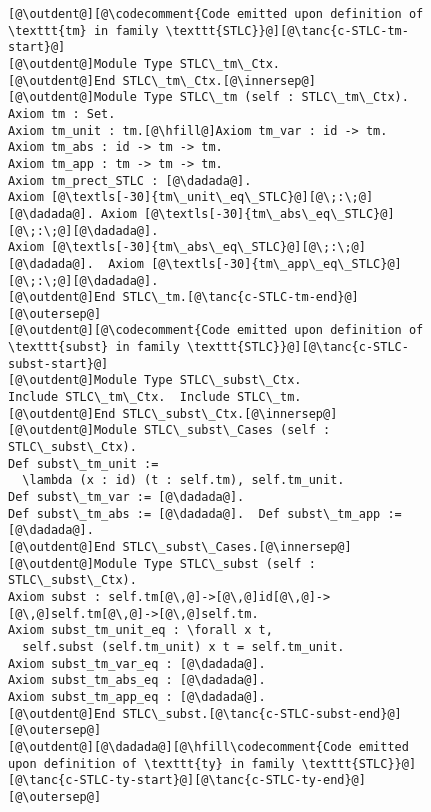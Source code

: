 \begin{figure}
\vspace{-5pt}
\begin{minipage}{\textwidth}
\begin{multicols}{2}



\newcommand{\innersep}{\vspace{6pt}}
\newcommand{\outersep}{\vspace{5pt}}
\newcommand{\outdent}{\!\!\!}

\begin{lstlisting}
[@\outdent@][@\codecomment{Code emitted upon definition of \texttt{tm} in family \texttt{STLC}}@][@\tanc{c-STLC-tm-start}@]
[@\outdent@]Module Type STLC\_tm\_Ctx.
[@\outdent@]End STLC\_tm\_Ctx.[@\innersep@]
[@\outdent@]Module Type STLC\_tm (self : STLC\_tm\_Ctx).
Axiom tm : Set.
Axiom tm_unit : tm.[@\hfill@]Axiom tm_var : id -> tm.
Axiom tm_abs : id -> tm -> tm.
Axiom tm_app : tm -> tm -> tm.
Axiom tm_prect_STLC : [@\dadada@].
Axiom [@\textls[-30]{tm\_unit\_eq\_STLC}@][@\;:\;@][@\dadada@]. Axiom [@\textls[-30]{tm\_abs\_eq\_STLC}@][@\;:\;@][@\dadada@].
Axiom [@\textls[-30]{tm\_abs\_eq\_STLC}@][@\;:\;@][@\dadada@].  Axiom [@\textls[-30]{tm\_app\_eq\_STLC}@][@\;:\;@][@\dadada@].
[@\outdent@]End STLC\_tm.[@\tanc{c-STLC-tm-end}@][@\outersep@]
[@\outdent@][@\codecomment{Code emitted upon definition of \texttt{subst} in family \texttt{STLC}}@][@\tanc{c-STLC-subst-start}@]
[@\outdent@]Module Type STLC\_subst\_Ctx.
Include STLC\_tm\_Ctx.  Include STLC\_tm.
[@\outdent@]End STLC\_subst\_Ctx.[@\innersep@]
[@\outdent@]Module STLC\_subst\_Cases (self : STLC\_subst\_Ctx).
Def subst\_tm_unit :=
  \lambda (x : id) (t : self.tm), self.tm_unit.
Def subst\_tm_var := [@\dadada@].
Def subst\_tm_abs := [@\dadada@].  Def subst\_tm_app := [@\dadada@].
[@\outdent@]End STLC\_subst\_Cases.[@\innersep@]
[@\outdent@]Module Type STLC\_subst (self : STLC\_subst\_Ctx).
Axiom subst : self.tm[@\,@]->[@\,@]id[@\,@]->[@\,@]self.tm[@\,@]->[@\,@]self.tm.
Axiom subst_tm_unit_eq : \forall x t,
  self.subst (self.tm_unit) x t = self.tm_unit.
Axiom subst_tm_var_eq : [@\dadada@].
Axiom subst_tm_abs_eq : [@\dadada@].
Axiom subst_tm_app_eq : [@\dadada@].
[@\outdent@]End STLC\_subst.[@\tanc{c-STLC-subst-end}@][@\outersep@]
[@\outdent@][@\dadada@][@\hfill\codecomment{Code emitted upon definition of \texttt{ty} in family \texttt{STLC}}@][@\tanc{c-STLC-ty-start}@][@\tanc{c-STLC-ty-end}@][@\outersep@]

\end{lstlisting}
\end{multicols}
\end{minipage}
\end{figure}
